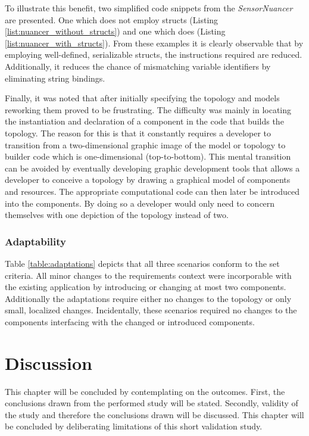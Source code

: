 To illustrate this benefit, two simplified code snippets from the \emph{SensorNuancer} are presented. One which does not employ structs (Listing \ref{list:nuancer_without_structs}) and one which does (Listing \ref{list:nuancer_with_structs}). From these examples it is clearly observable that by employing well-defined, serializable structs, the instructions required are reduced. Additionally, it reduces the chance of mismatching variable identifiers by eliminating string bindings.



Finally, it was noted that after initially specifying the topology and models reworking them proved to be frustrating. The difficulty was mainly in locating the instantiation and declaration of a component in the code that builds the topology. The reason for this is that it constantly requires a developer to transition from a two-dimensional graphic image of the model or topology to builder code which is one-dimensional (top-to-bottom). This mental transition can be avoided by eventually developing  graphic development tools that allows a developer to conceive a topology by drawing a graphical model of components and resources. The appropriate computational code can then later be introduced into the components. By doing so a developer would only need to concern themselves with one depiction of the topology instead of two.

\subsubsection{Adaptability}
Table \ref{table:adaptations} depicts that all three scenarios conform to the set criteria. All minor changes to the requirements context were incorporable with the existing application by introducing or changing at most two components. Additionally the adaptations require either no changes to the topology or only small, localized changes. Incidentally, these scenarios required no changes to the components interfacing with the changed or introduced components.

\section{Discussion}
This chapter will be concluded by contemplating on the outcomes. First, the conclusions drawn from the performed study will be stated. Secondly, validity of the study and therefore the conclusions drawn will be discussed. This chapter will be concluded by deliberating limitations of this short validation study.
